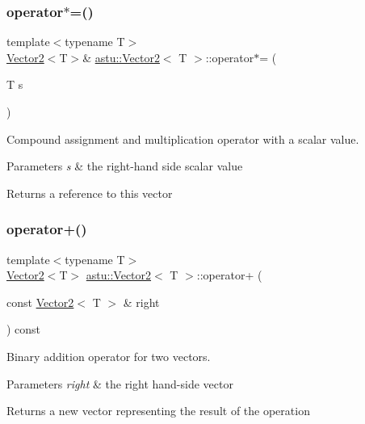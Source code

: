 \subsubsection{\texorpdfstring{operator$\ast$=()}{operator*=()}\hspace{0.1cm}{\footnotesize\ttfamily [2/2]}}
{\footnotesize\ttfamily template$<$typename T$>$ \\
\hyperlink{classastu_1_1Vector2}{Vector2}$<$T$>$\& \hyperlink{classastu_1_1Vector2}{astu\+::\+Vector2}$<$ T $>$\+::operator$\ast$= (\begin{DoxyParamCaption}\item[{T}]{s }\end{DoxyParamCaption})\hspace{0.3cm}{\ttfamily [inline]}}

Compound assignment and multiplication operator with a scalar value.


\begin{DoxyParams}{Parameters}
{\em s} & the right-\/hand side scalar value \\
\hline
\end{DoxyParams}
\begin{DoxyReturn}{Returns}
a reference to this vector 
\end{DoxyReturn}
\mbox{\label{classastu_1_1Vector2_a1ebf3c3f9ef6c8e07f6ea2327a630fca}} 
\subsubsection{\texorpdfstring{operator+()}{operator+()}}
{\footnotesize\ttfamily template$<$typename T$>$ \\
\hyperlink{classastu_1_1Vector2}{Vector2}$<$T$>$ \hyperlink{classastu_1_1Vector2}{astu\+::\+Vector2}$<$ T $>$\+::operator+ (\begin{DoxyParamCaption}\item[{const \hyperlink{classastu_1_1Vector2}{Vector2}$<$ T $>$ \&}]{right }\end{DoxyParamCaption}) const\hspace{0.3cm}{\ttfamily [inline]}}

Binary addition operator for two vectors.


\begin{DoxyParams}{Parameters}
{\em right} & the right hand-\/side vector \\
\hline
\end{DoxyParams}
\begin{DoxyReturn}{Returns}
a new vector representing the result of the operation 
\end{DoxyReturn}
\mbox{\label{classastu_1_1Vector2_a285af566f7b2e4a218932094ab9a70f8}} 
